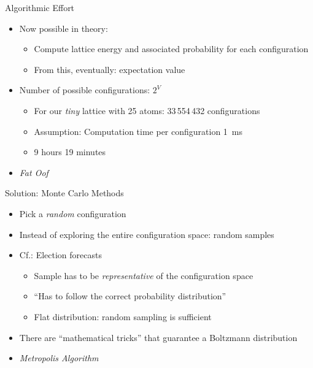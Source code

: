 
\begin{frame}{Algorithmic Effort}
%
\begin{itemize}
\item Now possible in theory:
	\begin{itemize}
	\item Compute lattice energy and associated probability for each configuration
	\item From this, eventually: expectation value
	\end{itemize}
\item Number of possible configurations: $2^V$
	\begin{itemize}
	\item For our \emph{tiny} lattice with 25 atoms: 33\,554\,432 configurations
	\item Assumption: Computation time per configuration \SI{1}{ms}
	\item[\Thus] 9 hours 19 minutes
	\end{itemize}
\item[\Thus]  \emph{Fat Oof}
\end{itemize}
%
\end{frame}


\begin{frame}{Solution: Monte Carlo Methods}
%
\begin{itemize}
\item Pick a \emph{random} configuration
\item[\Thus] Instead of exploring the entire configuration space: random samples
\item Cf.: Election forecasts
	\begin{itemize}
	\item Sample has to be \emph{representative} of the configuration space
	\item \enquote{Has to follow the correct probability distribution}
	\item Flat distribution: random sampling is sufficient
	\end{itemize}
\item There are \enquote{mathematical tricks} that guarantee a Boltzmann distribution
\item[\Thus] \emph{Metropolis Algorithm}
\end{itemize}
%
\end{frame}


